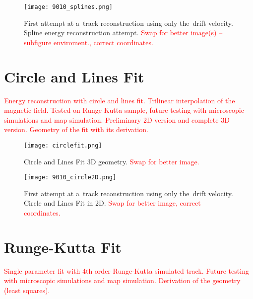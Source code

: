 		\begin{figure}
			\centering
			\texttt{[image: 9010\_splines.png]}
			\caption{First attempt at a~track reconstruction using only the~drift velocity. Spline energy reconstruction attempt. \textcolor{red}{Swap for better image(s) -- subfigure enviroment., correct coordinates.}}
			\label{fig:9010splines}
		\end{figure}
	
	\section{Circle and Lines Fit}
		\textcolor{red}{Energy reconstruction with circle and lines fit. Trilinear interpolation of the magnetic field. Tested on Runge-Kutta sample, future testing with microscopic simulations and map simulation. Preliminary 2D version and complete 3D version. Geometry of the fit with its derivation.}
		
		\begin{figure}
			\centering
			\texttt{[image: circlefit.png]}
			\caption{Circle and Lines Fit 3D geometry. \textcolor{red}{Swap for better image.}}
			\label{fig:circlefit}
		\end{figure}
		
		\begin{figure}
			\centering
			\texttt{[image: 9010\_circle2D.png]}
			\caption{First attempt at a~track reconstruction using only the~drift velocity. Circle and Lines Fit in 2D. \textcolor{red}{Swap for better image, correct coordinates.}}
			\label{fig:9010circle2D}
		\end{figure}
	
	\section{Runge-Kutta Fit}
		\textcolor{red}{Single parameter fit with 4th order Runge-Kutta simulated track. Future testing with microscopic simulations and map simulation. Derivation of the geometry (least squares).}